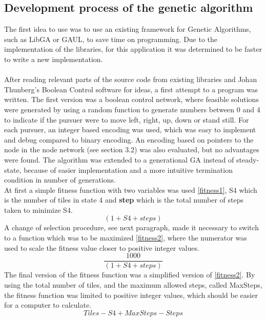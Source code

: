 \subsection{Development process of the genetic algorithm}
The first idea to use  was to use an existing framework for Genetic Algorithms, such as LibGA\cite{LibGA} or GAUL\cite{GAUL}, to save time on programming. Due to the implementation of the libraries, for this application it was determined to be faster to write a new implementation.\\
\\After reading relevant parts of the source code from existing libraries and Johan Thunberg's Boolean Control software \cite{paper1} for ideas, a first attempt to a program was written. The first version was a boolean control network, where feasible solutions were generated by using a random function to generate numbers between 0 and 4 to indicate if the pursuer were to move left, right, up, down or stand still. For each pursuer, an integer based encoding was used, which was easy to implement and debug compared to binary encoding. An encoding based on pointers to the node in the node network (see section 3.2) was also evaluated, but no advantages were found. The algorithm was extended to a generational GA instead of steady-state, because of easier implementation and a more intuitive termination condition in number of generations.\\
At first a simple fitness function with two variables was used \eqref{fitness1}, S4 which is the number of tiles in state 4 and \textbf{step} which is the total number of steps taken to minimize S4.
\begin{equation}\label{fitness1} (1+S4+steps) \end{equation}
A change of selection procedure, see next paragraph, made it necessary to switch to a function which was to be maximized \eqref{fitness2},  where the numerator was used to scale the fitness value closer to positive integer values.
\begin{equation}\label{fitness2} \frac{1000}{(1+S4+steps)} \end{equation}
The final version of the fitness function was a simplified version of \eqref{fitness2}. By using the total number of tiles, and the maximum allowed steps, called MaxSteps, the fitness function was limited to positive integer values, which should be easier for a computer to calculate.
\begin{equation} \label{fitness3}Tiles-S4+MaxSteps-Steps \end{equation}
